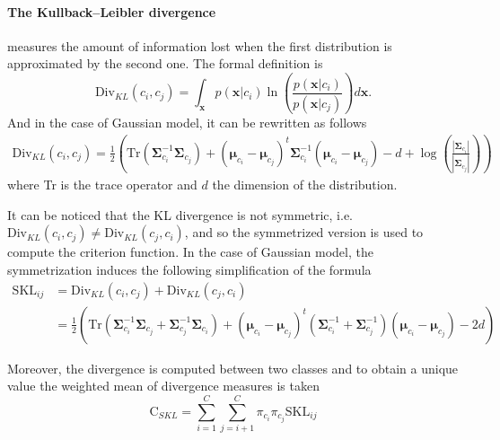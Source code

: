 \documentclass[a4paper,11pt,DIV=16,abstracton]{scrartcl}
\begin{document}
        \paragraph{The Kullback–Leibler divergence} measures the amount of information lost when the first distribution is approximated by the second one. The formal definition is
        \begin{equation}
            \text{Div}_{KL}(c_i,c_j) = \int_\mathbf{x} p(\mathbf{x}|c_i) \ln(\frac{p(\mathbf{x}|c_i)}{p(\mathbf{x}|c_j)}) d\mathbf{x}.
        \end{equation}
        And in the case of Gaussian model, it can be rewritten as follows
        \begin{align}
            \text{Div}_{KL}(c_i,c_j) = \frac{1}{2} \left( \text{Tr} (\boldsymbol{\Sigma}_{c_i}^{-1} \boldsymbol{\Sigma}_{c_j}) + (\boldsymbol{\mu}_{c_i} - \boldsymbol{\mu}_{c_j})^t \boldsymbol{\Sigma}_{c_i}^{-1} (\boldsymbol{\mu}_{c_i} - \boldsymbol{\mu}_{c_j}) - d + \log \left( \frac{|\boldsymbol{\Sigma}_{c_i}|}{|\boldsymbol{\Sigma}_{c_j}|} \right) \right)
        \end{align}
        where Tr is the trace operator and $d$ the dimension of the distribution.

        It can be noticed that the KL divergence is not symmetric, i.e. $\text{Div}_{KL}(c_i,c_j) \ne \text{Div}_{KL}(c_j,c_i)$, and so the symmetrized version is used to compute the criterion function. In the case of Gaussian model, the symmetrization induces the following simplification of the formula
        \begin{align}
            \text{SKL}_{ij} &=\text{Div}_{KL}(c_i,c_j) + \text{Div}_{KL}(c_j,c_i) \nonumber \\
            &= \frac{1}{2} \left( \text{Tr} (\boldsymbol{\Sigma}_{c_i}^{-1} \boldsymbol{\Sigma}_{c_j} + \boldsymbol{\Sigma}_{c_j}^{-1} \boldsymbol{\Sigma}_{c_i}) + (\boldsymbol{\mu}_{c_i} - \boldsymbol{\mu}_{c_j})^t (\boldsymbol{\Sigma}_{c_i}^{-1} + \boldsymbol{\Sigma}_{c_j}^{-1}) (\boldsymbol{\mu}_{c_i} - \boldsymbol{\mu}_{c_j}) - 2d \right)
        \end{align}

        Moreover, the divergence is computed between two classes and to obtain a unique value the weighted mean of divergence measures is taken
        \begin{equation}
            \text{C}_{SKL} = \sum_{i=1}^{C} \sum_{j=i + 1}^{C} \pi_{c_i} \pi_{c_j} \text{SKL}_{ij}
        \end{equation}
\end{document}
